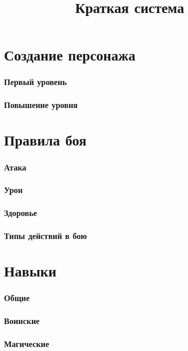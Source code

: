 
\title{Краткая система}
\maketitle
\tableofcontents

\clearpage
\part{Создание персонажа}
\section{Первый уровень}
\section{Повышение уровня}

\clearpage
\part{Правила боя}
\section{Атака}
\section{Урон}
\section{Здоровье}
\section{Типы действий в бою}

\clearpage
\part{Навыки}
\section{Общие}
\section{Воинские}
\section{Магические}

\clearpage
